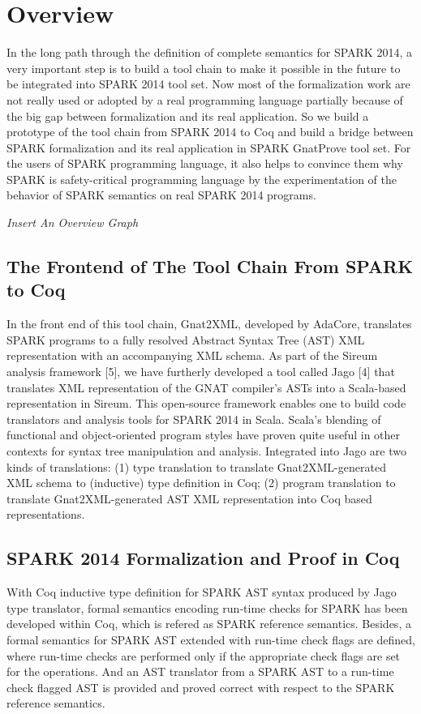 \section{Overview}
In the long path through the definition of complete semantics for SPARK 2014, a
very important step is to build a tool chain to make it possible in the future
to be integrated into SPARK 2014 tool set. Now most of the formalization work
are not really used or adopted by a real programming language partially because
of the big gap between formalization and its real application. So we build a
prototype of the tool chain from SPARK 2014 to Coq and build a bridge between
SPARK formalization and its real application in SPARK GnatProve tool set. For
the users of SPARK programming language, it also helps to convince them why
SPARK is safety-critical programming language by the experimentation of the
behavior of SPARK semantics on real SPARK 2014 programs.

\textit{Insert An Overview Graph}

\subsection{The Frontend of The Tool Chain From SPARK to Coq}
In the front end of this tool chain, Gnat2XML, developed by AdaCore, translates
SPARK programs to a fully resolved Abstract Syntax Tree (AST) XML representation
with an accompanying XML schema. As part of the Sireum analysis framework
[5], we have furtherly developed a tool called Jago [4] that translates XML
representation of the GNAT compiler's ASTs into a Scala-based representation in
Sireum. This open-source framework enables one to build code translators and
analysis tools for SPARK 2014 in Scala. Scala’s blending of functional and
object-oriented program styles have proven quite useful in other contexts for
syntax tree manipulation and analysis. Integrated into Jago are two kinds of
translations: (1) type translation to translate Gnat2XML-generated XML schema to
(inductive) type definition in Coq; (2) program translation to translate
Gnat2XML-generated AST XML representation into Coq based representations.

\subsection{SPARK 2014 Formalization and Proof in Coq}
With Coq inductive type definition for SPARK AST syntax produced by Jago type
translator, formal semantics encoding run-time checks for SPARK has
been developed within Coq, which is refered as SPARK reference semantics.
Besides, a formal semantics for SPARK AST extended with run-time check flags
are defined, where run-time checks are performed only if the appropriate check
flags are set for the operations. And an AST translator from a SPARK AST to a
run-time check flagged AST is provided and proved correct with respect to the
SPARK reference semantics.

